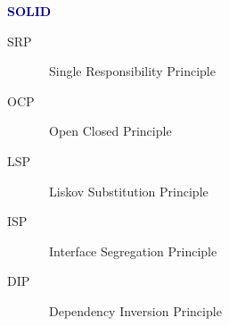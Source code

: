 \textbf{\textcolor{darkblue}{SOLID}}~
\begin{description}
	\item[\textsc{S}RP] \ \textcolor{mehrred}{S}ingle Responsibility Principle
	\item[\textsc{O}CP] \ \textcolor{mehrred}{O}pen Closed Principle
	\item[\textsc{L}SP] \ \textcolor{mehrred}{L}iskov Substitution Principle
	\item[\textsc{I}SP] \ \textcolor{mehrred}{I}nterface Segregation Principle
	\item[\textsc{D}IP] \ \textcolor{mehrred}{D}ependency Inversion Principle 
\end{description}

 